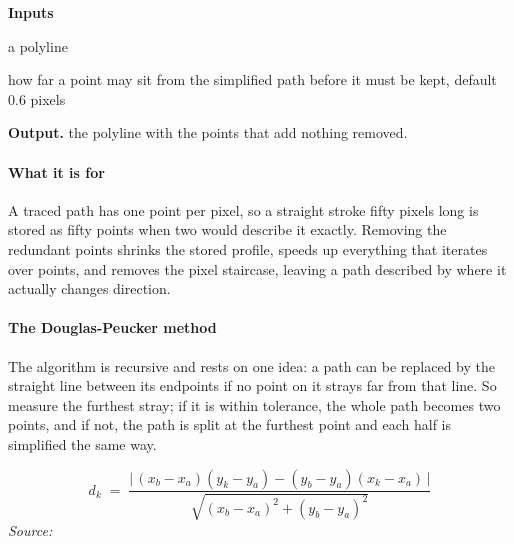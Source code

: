 \noindent\textbf{Inputs}
\begin{description}[leftmargin=2.2em,style=nextline,font=\normalfont\ttfamily]\setlength\itemsep{1pt}
  \item[{poly}] \normalfont a polyline
  \item[{eps}] \normalfont how far a point may sit from the simplified path before it must be kept, default 0.6 pixels
\end{description}

\noindent\textbf{Output.} the polyline with the points that add nothing removed.


\paragraph{What it is for}
A traced path has one point per pixel, so a straight stroke fifty pixels long is stored as fifty points when two would describe it exactly. Removing the redundant points shrinks the stored profile, speeds up everything that iterates over points, and removes the pixel staircase, leaving a path described by where it actually changes direction.


\paragraph{The Douglas-Peucker method}
The algorithm \cite{douglaspeucker1973} is recursive and rests on one idea: a path can be replaced by the straight line between its endpoints if no point on it strays far from that line. So measure the furthest stray; if it is within tolerance, the whole path becomes two points, and if not, the path is split at the furthest point and each half is simplified the same way.


\begin{equation}
d_k \;=\; \frac{\big|\,(x_b-x_a)(y_k-y_a) - (y_b-y_a)(x_k-x_a)\,\big|}{\sqrt{(x_b-x_a)^2 + (y_b-y_a)^2}}
\end{equation}
\noindent\emph{Source: }\cite{douglaspeucker1973}


